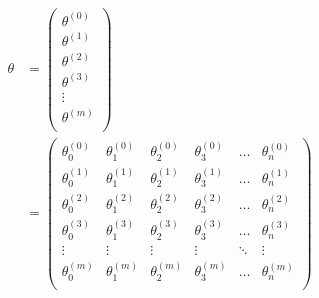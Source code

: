 \begin{equation}
\begin{aligned}
\theta & = \left(\begin{matrix}
		\theta^{(0)} \\ \theta^{(1)} \\ \theta^{(2)} \\ \theta^{(3)} \\ \vdots \\ \theta^{(m)} \\
	\end{matrix}\right) \\
& = \left(\begin{matrix}
		\theta_0^{(0)} & \theta_1^{(0)} & \theta_2^{(0)} & \theta_3^{(0)} & \dots & \theta_n^{(0)} \\
		\theta_0^{(1)} & \theta_1^{(1)} & \theta_2^{(1)} & \theta_3^{(1)} & \dots & \theta_n^{(1)} \\
		\theta_0^{(2)} & \theta_1^{(2)} & \theta_2^{(2)} & \theta_3^{(2)} & \dots & \theta_n^{(2)} \\
		\theta_0^{(3)} & \theta_1^{(3)} & \theta_2^{(3)} & \theta_3^{(3)} & \dots & \theta_n^{(3)} \\
		\vdots    & \vdots    & \vdots    & \vdots    & \ddots & \vdots   \\
		\theta_0^{(m)} & \theta_1^{(m)} & \theta_2^{(m)} & \theta_3^{(m)} & \dots & \theta_n^{(m)} \\
		\end{matrix}\right)
	\end{aligned}
\end{equation}
















